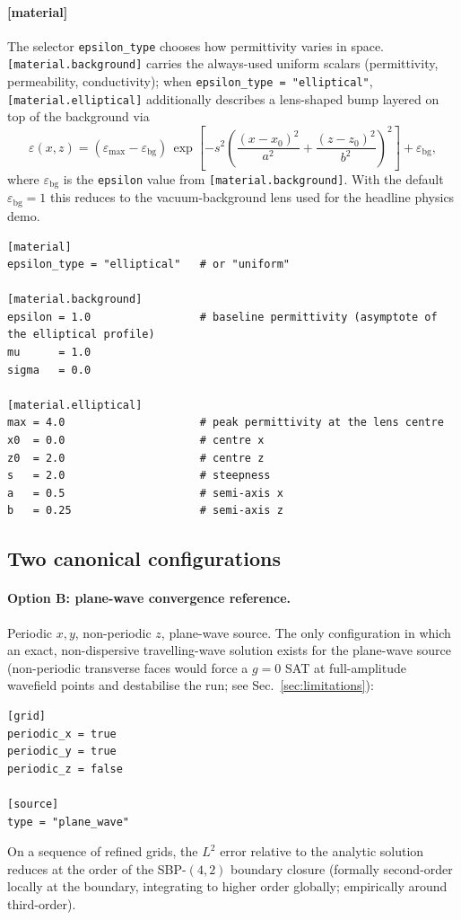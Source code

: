 \documentclass[11pt]{article}
\begin{document}
\paragraph{[material]} The selector \texttt{epsilon\_type} chooses how
permittivity varies in space. \texttt{[material.background]} carries
the always-used uniform scalars (permittivity, permeability,
conductivity); when \texttt{epsilon\_type = "elliptical"},
\texttt{[material.elliptical]} additionally describes a lens-shaped
bump layered on top of the background via
\[
  \varepsilon(x, z) =
    (\varepsilon_\text{max} - \varepsilon_\text{bg})\,
      \exp\!\left[-s^2 \left(\frac{(x - x_0)^2}{a^2} + \frac{(z - z_0)^2}{b^2}\right)^2\right]
    + \varepsilon_\text{bg},
\]
where $\varepsilon_\text{bg}$ is the \texttt{epsilon} value from
\texttt{[material.background]}. With the default
$\varepsilon_\text{bg} = 1$ this reduces to the vacuum-background
lens used for the headline physics demo.
\begin{lstlisting}[language={}]
[material]
epsilon_type = "elliptical"   # or "uniform"

[material.background]
epsilon = 1.0                 # baseline permittivity (asymptote of the elliptical profile)
mu      = 1.0
sigma   = 0.0

[material.elliptical]
max = 4.0                     # peak permittivity at the lens centre
x0  = 0.0                     # centre x
z0  = 2.0                     # centre z
s   = 2.0                     # steepness
a   = 0.5                     # semi-axis x
b   = 0.25                    # semi-axis z
\end{lstlisting}

\subsection{Two canonical configurations}

\paragraph{Option B: plane-wave convergence reference.}
Periodic $x, y$, non-periodic $z$, plane-wave source. The only
configuration in which an exact, non-dispersive travelling-wave
solution exists for the plane-wave source (non-periodic transverse
faces would force a $g = 0$ SAT at full-amplitude wavefield points
and destabilise the run; see Sec.~\ref{sec:limitations}):
\begin{lstlisting}[language={}]
[grid]
periodic_x = true
periodic_y = true
periodic_z = false

[source]
type = "plane_wave"
\end{lstlisting}
On a sequence of refined grids, the $L^2$ error relative to the
analytic solution reduces at the order of the SBP-$(4,2)$ boundary
closure (formally second-order locally at the boundary, integrating
to higher order globally; empirically around third-order).
\end{document}
